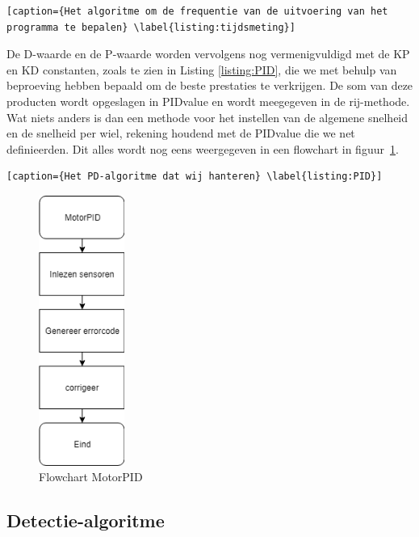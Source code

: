 
\begin{lstlisting}[caption={Het algoritme om de frequentie van de uitvoering van het programma te bepalen} \label{listing:tijdsmeting}]
\end{lstlisting}

De D-waarde en de P-waarde worden vervolgens nog vermenigvuldigd met de KP en KD constanten, zoals te zien in Listing \ref{listing:PID},  die we met behulp van beproeving hebben bepaald om de beste prestaties te verkrijgen. De som van deze producten wordt opgeslagen in PIDvalue en wordt meegegeven in de rij-methode. Wat niets anders is dan een methode voor het instellen van de algemene snelheid en de snelheid per wiel, rekening houdend met de PIDvalue die we net definieerden. Dit alles wordt nog eens weergegeven in een flowchart in figuur~\ref{fig:flowchartMotor}.


\begin{lstlisting}[caption={Het PD-algoritme dat wij hanteren} \label{listing:PID}]
\end{lstlisting}

\begin{figure}[h]
\centering
\includegraphics[width=0.25\textwidth]{MotorPIDFlowchart.png}
\caption{Flowchart MotorPID}
\label{fig:flowchartMotor}
\end{figure}


\subsection{Detectie-algoritme}

